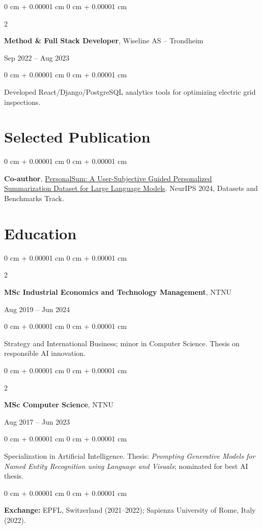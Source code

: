 \documentclass[10pt, letterpaper]{article}
\newenvironment{onecolentry}{
    \begin{adjustwidth}{
        0 cm + 0.00001 cm
    }{
        0 cm + 0.00001 cm
    }
}{
    \end{adjustwidth}
} %
\newenvironment{twocolentry}[2][]{
    \onecolentry
    \def\secondColumn{#2}
    \setcolumnwidth{\fill, 4.5 cm}
    \begin{paracol}{2}
}{
    \switchcolumn \raggedleft \secondColumn
    \end{paracol}
    \endonecolentry
} %
\begin{document}
\vspace{0.2 cm}
\begin{twocolentry}{Sep 2022 – Aug 2023}
    \textbf{Method \& Full Stack Developer}, Wiseline AS – Trondheim
\end{twocolentry}
\begin{onecolentry}
    Developed React/Django/PostgreSQL analytics tools for optimizing electric grid inspections.
\end{onecolentry}

\section{Selected Publication}

\begin{onecolentry}
    \textbf{Co-author}, \href{https://arxiv.org/abs/2410.03905}{PersonalSum: A User-Subjective Guided Personalized Summarization Dataset for Large Language Models}. NeurIPS 2024, Datasets and Benchmarks Track.
\end{onecolentry}

\newpage
\section{Education}

\begin{twocolentry}{Aug 2019 – Jun 2024}
    \textbf{MSc Industrial Economics and Technology Management}, NTNU
\end{twocolentry}
\begin{onecolentry}
    Strategy and International Business; minor in Computer Science. Thesis on responsible AI innovation.
\end{onecolentry}

\vspace{0.2 cm}
\begin{twocolentry}{Aug 2017 – Jun 2023}
    \textbf{MSc Computer Science}, NTNU
\end{twocolentry}
\begin{onecolentry}
    Specialization in Artificial Intelligence. Thesis: \textit{Prompting Generative Models for Named Entity Recognition using Language and Visuals}; nominated for best AI thesis.
\end{onecolentry}

\vspace{0.15 cm}
\begin{onecolentry}
    \textbf{Exchange:} EPFL, Switzerland (2021–2022); Sapienza University of Rome, Italy (2022).
\end{onecolentry}
\end{document}
